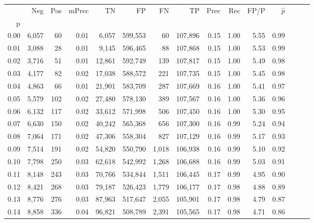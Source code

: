 \begin{tabular}{rrrrrrrrrrrrrrr}
\toprule
{} &     Neg &    Pos & mPrec &       TN &       FP &       FN &       TP &  Prec &   Rec &  FP/P & $\hat{p}$ \\
p    &         &        &       &          &          &          &          &       &       &       &           \\
\midrule
0.00 &   6,057 &     60 &  0.01 &    6,057 &  599,553 &       60 &  107,896 &  0.15 &  1.00 &  5.55 &      0.99 \\
0.01 &   3,088 &     28 &  0.01 &    9,145 &  596,465 &       88 &  107,868 &  0.15 &  1.00 &  5.53 &      0.99 \\
0.02 &   3,716 &     51 &  0.01 &   12,861 &  592,749 &      139 &  107,817 &  0.15 &  1.00 &  5.49 &      0.98 \\
0.03 &   4,177 &     82 &  0.02 &   17,038 &  588,572 &      221 &  107,735 &  0.15 &  1.00 &  5.45 &      0.98 \\
0.04 &   4,863 &     66 &  0.01 &   21,901 &  583,709 &      287 &  107,669 &  0.16 &  1.00 &  5.41 &      0.97 \\
0.05 &   5,579 &    102 &  0.02 &   27,480 &  578,130 &      389 &  107,567 &  0.16 &  1.00 &  5.36 &      0.96 \\
0.06 &   6,132 &    117 &  0.02 &   33,612 &  571,998 &      506 &  107,450 &  0.16 &  1.00 &  5.30 &      0.95 \\
0.07 &   6,630 &    150 &  0.02 &   40,242 &  565,368 &      656 &  107,300 &  0.16 &  0.99 &  5.24 &      0.94 \\
0.08 &   7,064 &    171 &  0.02 &   47,306 &  558,304 &      827 &  107,129 &  0.16 &  0.99 &  5.17 &      0.93 \\
0.09 &   7,514 &    191 &  0.02 &   54,820 &  550,790 &    1,018 &  106,938 &  0.16 &  0.99 &  5.10 &      0.92 \\
0.10 &   7,798 &    250 &  0.03 &   62,618 &  542,992 &    1,268 &  106,688 &  0.16 &  0.99 &  5.03 &      0.91 \\
0.11 &   8,148 &    243 &  0.03 &   70,766 &  534,844 &    1,511 &  106,445 &  0.17 &  0.99 &  4.95 &      0.90 \\
0.12 &   8,421 &    268 &  0.03 &   79,187 &  526,423 &    1,779 &  106,177 &  0.17 &  0.98 &  4.88 &      0.89 \\
0.13 &   8,776 &    276 &  0.03 &   87,963 &  517,647 &    2,055 &  105,901 &  0.17 &  0.98 &  4.79 &      0.87 \\
0.14 &   8,858 &    336 &  0.04 &   96,821 &  508,789 &    2,391 &  105,565 &  0.17 &  0.98 &  4.71 &      0.86 \\

\end{tabular}

